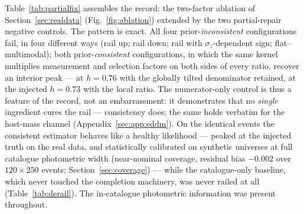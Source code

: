 Table~\ref{tab:partialfix} assembles the record: the two-factor ablation of Section~\ref{sec:realdata} (Fig.~\ref{fig:ablation}) extended by the two partial-repair negative controls. The pattern is exact. All four prior-\emph{inconsistent} configurations fail, in four different ways (rail up; rail down; rail with $\sigma_z$-dependent sign; flat--multimodal); both prior-\emph{consistent} configurations, in which the same kernel multiplies measurement and selection factors on both sides of every ratio, recover an interior peak --- at $h = 0.76$ with the globally tilted denominator retained, at the injected $h = 0.73$ with the local ratio. %
The numerator-only control is thus a feature of the record, not an embarrassment: it demonstrates that no \emph{single} ingredient cures the rail --- consistency does; the same holds verbatim for the host-mass channel (Appendix~\ref{sec:app:eddm}). On the identical events the consistent estimator behaves like a healthy likelihood --- peaked at the injected truth on the real data, and statistically calibrated on synthetic universes at full catalogue photometric width (near-nominal coverage, residual bias $-0.002$ over $120 \times 250$ events; Section~\ref{sec:coverage}) --- %
while the catalogue-only baseline, which never touched the completion machinery, was never railed at all (Table~\ref{tab:derail}). The in-catalogue photometric information was present throughout.

